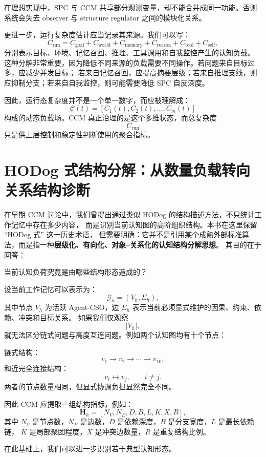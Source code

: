 在理想实现中，SPC 与 CCM 共享部分观测变量，却不能合并成同一功能。否则系统会失去 observer 与 structure regulator
之间的模块化关系。

更进一步，运行复杂度估计应当记录其来源。我们可以写：
\[
C_{\mathrm{run}}
=
C_{\mathrm{goal}}
+
C_{\mathrm{world}}
+
C_{\mathrm{memory}}
+
C_{\mathrm{reason}}
+
C_{\mathrm{tool}}
+
C_{\mathrm{self}},
\]
分别表示目标、环境、记忆召回、推理、工具调用和自我监控产生的认知负载。
这种分解非常重要，因为降低不同来源的负载需要不同操作。若问题来自目标过多，应减少并发目标；
若来自记忆召回，应提高摘要层级；若来自推理支线，则应抑制分支；若来自自我监控，则可能需要降低 SPC 自反深度。

因此，运行态复杂度并不是一个单一数字，而应被理解成：
\[
\boxed{
\mathcal C(t)
=
[C_1(t),C_2(t),\ldots,C_m(t)]
}
\]
构成的动态负载场。CCM 真正治理的是这个多维状态，而总复杂度
\[
C_{\mathrm{run}}
\]
只是供上层控制和稳定性判断使用的聚合指标。


\section{HODog 式结构分解：从数量负载转向关系结构诊断}

在早期 CCM 讨论中，我们曾提出通过类似 HODog 的结构描述方法，不只统计工作记忆中存在多少内容，
而是识别当前认知图的高阶组织结构。本书在这里保留 ``HODog 式'' 这一历史术语，
但需要明确：它并不是引用某个成熟外部标准算法，而是指一种\textbf{层级化、有向化、对象--关系化的认知结构分解思想}。
其目的在于回答：
\begin{statementbox}
当前认知负荷究竟是由哪些结构形态造成的？
\end{statementbox}

设当前工作记忆可以表示为：
\[
\mathcal G_h
=
(V_h,E_h),
\]
其中节点 $V_h$ 为活跃 Agent-CSO，边 $E_h$ 表示当前必须显式维护的因果、约束、依赖、冲突和目标关系。
如果我们仅观察
\[
|V_h|,
\]
就无法区分链式问题与高度互连问题。例如两个认知图均有十个节点：

链式结构：
\[
v_1\rightarrow v_2\rightarrow\cdots\rightarrow v_{10},
\]
和近完全连接结构：
\[
v_i\leftrightarrow v_j,
\qquad
i\neq j.
\]
两者的节点数量相同，但显式协调负担显然完全不同。

因此 CCM 应提取一组结构指标，例如：
\[
\mathbf H_h
=
[
N_V,
N_E,
D,
B,
L,
K,
X,
R
],
\]
其中 $N_V$ 是节点数，$N_E$ 是边数，$D$ 是依赖深度，$B$ 是分支宽度，$L$ 是最长依赖链，
$K$ 是局部聚团程度，$X$ 是冲突边数量，$R$ 是重复结构比例。

在此基础上，我们可以进一步识别若干典型认知形态。

